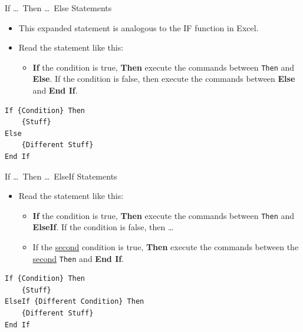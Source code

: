 \documentclass{beamer}
\begin{document}
\begin{frame}[fragile]{If \ldots\ Then \ldots\ Else Statements}
\begin{itemize}
  \item This expanded statement is analogous to the IF function in Excel.
  \item Read the statement like this:
  \begin{itemize}
    \item \textbf{If} the condition is true, \textbf{Then} execute the commands between
          \texttt{Then} and \textbf{Else}. If the condition is false, then execute the commands
          between \textbf{Else} and \textbf{End If}.
  \end{itemize}
\end{itemize}
\begin{center}
\begin{minipage}{0.5\textwidth}
\begin{lstlisting}[language=VBA]
If {Condition} Then
    {Stuff}
Else
    {Different Stuff}
End If
\end{lstlisting}
\end{minipage}
\end{center}
\end{frame}

\begin{frame}[fragile]{If \ldots\ Then \ldots\ ElseIf Statements}
\begin{itemize}
  \item Read the statement like this:
  \begin{itemize}
    \item \textbf{If} the condition is true, \textbf{Then} execute the commands between
          \texttt{Then} and \textbf{ElseIf}. If the condition is false, then \ldots
    \item If the \underline{second} condition is true, \textbf{Then} execute the commands
          between the \underline{second} \texttt{Then} and \textbf{End If}.
  \end{itemize}
\end{itemize}
\begin{center}
\begin{minipage}{0.6\textwidth}
\begin{lstlisting}[language=VBA]
If {Condition} Then
    {Stuff}
ElseIf {Different Condition} Then
    {Different Stuff}
End If
\end{lstlisting}
\end{minipage}
\end{center}
\end{frame}
\end{document}
